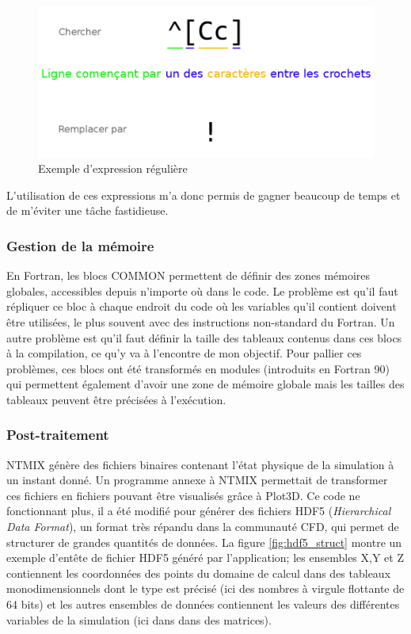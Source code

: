 \begin{figure}[ht]
  \centering
  \includegraphics[scale=0.3]{figures/regex.png}
  \caption{\label{fig:regex}Exemple d'expression régulière}
\end{figure}


L'utilisation de ces expressions m'a donc permis de gagner beaucoup de temps et de m'éviter une tâche fastidieuse.

\subsubsection{Gestion de la mémoire}En Fortran, les blocs COMMON permettent de définir des zones mémoires globales, accessibles depuis n'importe où dans le code. Le problème est qu'il faut répliquer ce bloc à chaque endroit du code où les variables qu'il contient doivent être utilisées, le plus souvent avec des instructions non-standard du Fortran. Un autre problème est qu'il faut définir la taille des tableaux contenus dans ces blocs à la compilation, ce qu'y va à l'encontre de mon objectif. Pour pallier ces problèmes, ces blocs ont été transformés en modules (introduits en Fortran 90) qui permettent également d'avoir une zone de mémoire globale mais les tailles des tableaux peuvent être précisées à l'exécution.

\subsubsection{Post-traitement}NTMIX génère des fichiers binaires contenant l'état physique de la simulation à un instant donné. Un programme annexe à NTMIX permettait de transformer ces fichiers en fichiers pouvant être visualisés grâce à Plot3D. Ce code ne fonctionnant plus, il a été modifié pour générer des fichiers HDF5 (\textit{Hierarchical Data Format}), un format très répandu dans la communauté CFD, qui permet de structurer de grandes quantités de données. La figure \ref{fig:hdf5_struct} montre un exemple d'entête de fichier HDF5 généré par l'application; les ensembles X,Y et Z contiennent les coordonnées des points du domaine de calcul dans des tableaux monodimensionnels dont le type est précisé (ici des nombres à virgule flottante de 64 bits) et les autres ensembles de données contiennent les valeurs des différentes variables de la simulation (ici dans dans des matrices).


